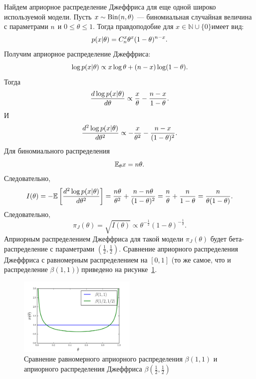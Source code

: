 \begin{example}
Найдем априорное распределение Джеффриса для еще одной широко используемой модели.
Пусть $x \sim \mathrm{Bin}(n, \theta)$ --- биномиальная случайная величина с параметрами $n$ и $0 \leq \theta \leq 1$.
Тогда правдоподобие для $x \in \mathbb{N} \cup \{0\}$имеет вид:
\[
p(x | \theta) = C_{n}^x \theta^x (1- \theta)^{n - x}.
\]
Получим априорное распределение Джеффриса:
\[
\log p(x | \theta) \propto x \log \theta + (n - x) \log(1 - \theta).
\]
Тогда 
\[
\frac{ d \log p(x | \theta)}{d \theta} \propto \frac{x}{\theta} - \frac{n - x}{1 - \theta}.
\]
И
\[
\frac{ d^2 \log p(x | \theta)}{d \theta^2} \propto -\frac{x}{\theta^2} - \frac{n - x}{(1 - \theta)^2}.
\]
Для биномиального распределения
\[
\mathbb{E}_\theta x = n \theta.
\]
Следовательно,
\[
I(\theta) = -\mathbb{E} \left[\frac{d^2 \log p(x | \theta)}{d \theta^2} \right] = \frac{n \theta}{\theta^2} + \frac{n - n\theta}{(1 - \theta)^2} =
\frac{n}{\theta} + \frac{n}{1 - \theta} = \frac{n}{\theta (1 - \theta)}.
\]
Следовательно,
\[
\pi_J(\theta) = \sqrt{I(\theta)} \propto \theta^{-\frac12} (1 - \theta)^{-\frac12}.
\]
Априорным распределением Джеффриса для такой модели $\pi_J(\theta)$ будет бета-распределение с параметрами $(\frac12, \frac12)$.
Сравнение априорного распределения Джеффриса с равномерным распределением на $[0, 1]$ (то же самое, что и распределение $\beta(1, 1)$)
приведено на рисунке~\ref{fig:beta_comparison}.

\begin{figure}
\centering
\includegraphics[width=0.5\textwidth]{figures/beta_comparison.png}
\caption{Сравнение равномерного априорного распределения $\beta(1, 1)$ и априорного распределения Джеффриса $\beta(\frac12, \frac12)$}
\label{fig:beta_comparison}
\end{figure}
\end{example}

